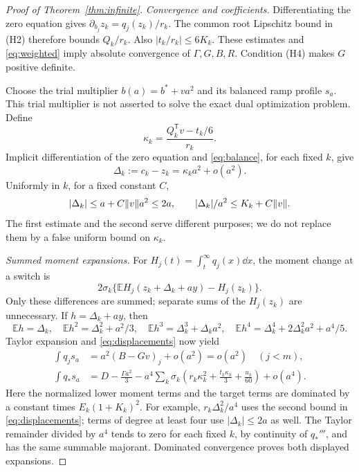 \begin{proof}[Proof of Theorem~\ref{thm:infinite}]
\emph{Convergence and coefficients.}
Differentiating the zero equation gives
\(\partial_{b_j}z_k=q_j(z_k)/r_k\).
The common root Lipschitz bound in (H2) therefore bounds \(Q_k/r_k\).
Also \(|t_k/r_k|\leq6K_k\).
These estimates and \eqref{eq:weighted} imply absolute convergence of
\(\Gamma,G,B,R\). Condition (H4) makes \(G\) positive definite.

Choose the trial multiplier \(b(a)=b^*+va^2\) and its balanced ramp
profile \(s_a\). This trial multiplier is not asserted to solve the exact
dual optimization problem. Define
\begin{equation}\label{eq:kappa}
 \kappa_k=\frac{Q_k^{\mathsf T}v-t_k/6}{r_k}.
\end{equation}
Implicit differentiation of the zero equation and
\eqref{eq:balance}, for each fixed \(k\), give
\[
 \Delta_k:=c_k-z_k=\kappa_ka^2+o(a^2).
\]
Uniformly in \(k\), for a fixed constant \(C\),
\begin{equation}\label{eq:displacements}
 |\Delta_k|\leq a+C\lVert v\rVert a^2\leq2a,\qquad
 |\Delta_k|/a^2\leq K_k+C\lVert v\rVert.
\end{equation}
The first estimate and the second serve different purposes; we do not
replace them by a false uniform bound on \(\kappa_k\).

\emph{Summed moment expansions.}
For \(H_j(t)=\int_t^\infty q_j(x)\dd x\), the moment change at a switch is
\[
 2\sigma_k\{\mathbb E H_j(z_k+\Delta_k+ay)-H_j(z_k)\}.
\]
Only these differences are summed; separate sums of the \(H_j(z_k)\)
are unnecessary. If \(h=\Delta_k+ay\), then
\[
 \mathbb E h=\Delta_k,\quad
 \mathbb E h^2=\Delta_k^2+a^2/3,\quad
 \mathbb E h^3=\Delta_k^3+\Delta_ka^2,\quad
 \mathbb E h^4=\Delta_k^4+2\Delta_k^2a^2+a^4/5 .
\]
Taylor expansion and \eqref{eq:displacements} now yield
\begin{align}
 \int q_js_a&=a^2(B-Gv)_j+o(a^2)=o(a^2)\quad(j<m),\label{eq:defect}\\
 \int q_*s_a&=D-\frac{\Gamma a^2}{3}
 -a^4\sum_k\sigma_k
 \left(r_k\kappa_k^2+\frac{t_k\kappa_k}{3}+\frac{u_k}{60}\right)
 +o(a^4).\label{eq:targetexp}
\end{align}
Here the normalized lower moment terms and the target terms are dominated
by a constant times \(E_k(1+K_k)^2\).
For example, \(r_k\Delta_k^2/a^4\) uses the second bound in
\eqref{eq:displacements}; terms of degree at least four use
\(|\Delta_k|\leq2a\) as well. The Taylor remainder divided by \(a^4\)
tends to zero for each fixed \(k\), by continuity of \(q_*'''\), and has
the same summable majorant. Dominated convergence proves both displayed
expansions.


\end{proof}
